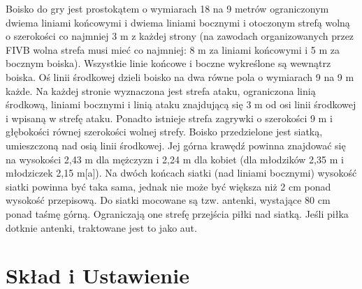\documentclass[14pt,oneside,a4paper]{book}
\theoremstyle{break}
\begin{document}
Boisko do gry jest prostokątem o wymiarach 18 na 9 metrów ograniczonym dwiema liniami końcowymi i dwiema liniami bocznymi i otoczonym strefą wolną o szerokości co najmniej 3 m z każdej strony (na zawodach organizowanych przez FIVB wolna strefa musi mieć co najmniej: 8 m za liniami końcowymi i 5 m za bocznym boiska). Wszystkie linie końcowe i boczne wykreślone są wewnątrz boiska. Oś linii środkowej dzieli boisko na dwa równe pola o wymiarach 9 na 9 m każde. Na każdej stronie wyznaczona jest strefa ataku, ograniczona linią środkową, liniami bocznymi i linią ataku znajdującą się 3 m od osi linii środkowej i wpisaną w strefę ataku. Ponadto istnieje strefa zagrywki o szerokości 9 m i głębokości równej szerokości wolnej strefy.
Boisko przedzielone jest siatką, umieszczoną nad osią linii środkowej. Jej górna krawędź powinna znajdować się na wysokości 2,43 m dla mężczyzn i 2,24 m dla kobiet (dla młodzików 2,35 m i młodziczek 2,15 m[a]). Na dwóch końcach siatki (nad liniami bocznymi) wysokość siatki powinna być taka sama, jednak nie może być większa niż 2 cm ponad wysokość przepisową.
Do siatki mocowane są tzw. antenki, wystające 80 cm ponad taśmę górną. Ograniczają one strefę przejścia piłki nad siatką. Jeśli piłka dotknie antenki, traktowane jest to jako aut.

\section {Skład i Ustawienie}
\end{document}

